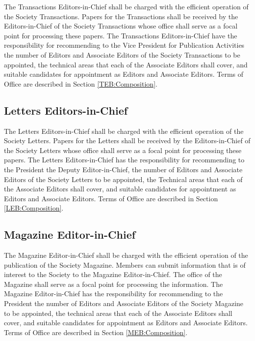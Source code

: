 \documentclass[10pt]{article}
\newcommand{\secref}[1]{Section \ref{#1}}
\begin{document}
The Transactions Editors-in-Chief shall be charged with the efficient operation of the Society Transactions.  Papers for the Transactions shall be received by the Editors-in-Chief of the Society Transactions whose office shall serve as a focal point for processing these papers. The Transactions Editors-in-Chief have the responsibility for recommending to the Vice President for Publication Activities the number of Editors and Associate Editors of the Society Transactions to be appointed, the technical areas that each of the Associate Editors shall cover, and suitable candidates for appointment as Editors and Associate Editors. Terms of Office are described in \secref{TEB:Composition}.


\subsection{Letters Editors-in-Chief}

The Letters Editors-in-Chief shall be charged with the efficient operation of the Society Letters.  Papers for the Letters shall be received by the Editors-in-Chief of the Society Letters whose office shall serve as a focal point for processing these papers.  The Letters Editors-in-Chief has the responsibility for recommending to the President the Deputy Editor-in-Chief, the number of Editors and Associate Editors of the Society Letters to be appointed, the Technical areas that each of the Associate Editors shall cover, and suitable candidates for appointment as Editors and Associate Editors. Terms of Office are described in \secref{LEB:Composition}.


\subsection{Magazine Editor-in-Chief}

The Magazine Editor-in-Chief shall be charged with the efficient operation of the publication of the Society Magazine. Members can submit information that is of interest to the Society to the Magazine Editor-in-Chief. The office of the Magazine shall serve as a focal point for processing the information. The Magazine Editor-in-Chief has the responsibility for recommending to the President the number of Editors and Associate Editors of the Society Magazine to be appointed, the technical areas that each of the Associate Editors shall cover, and suitable candidates for appointment as Editors and Associate Editors. Terms of Office are described in \secref{MEB:Composition}. 
\end{document}
